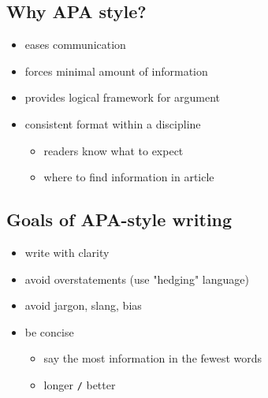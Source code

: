 \documentclass[11pt]{article}
\begin{document}
\subsection*{Why APA style?}
\label{sec-3-4}
\begin{itemize}
\item eases communication
\item forces minimal amount of information
\item provides logical framework for argument
\item consistent format within a discipline
\begin{itemize}
\item readers know what to expect
\item where to find information in article
\end{itemize}
\end{itemize}

\subsection*{Goals of APA-style writing}
\label{sec-3-5}
\begin{itemize}
\item write with clarity
\item avoid overstatements (use "hedging" language)
\item avoid jargon, slang, bias
\item be concise
\begin{itemize}
\item say the most information in the fewest words
\item longer \texttt{/} better
\end{itemize}
\end{itemize}
\end{document}
